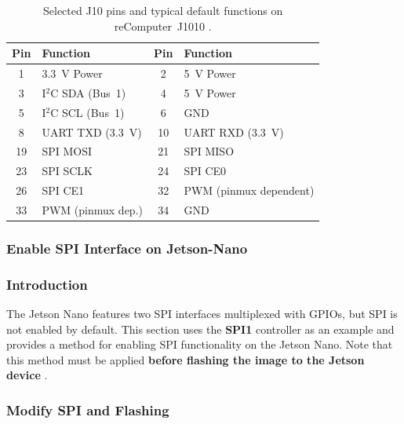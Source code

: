 \newpage
\begin{table}[H]
	\centering
	\caption{Selected J10 pins and typical default functions on reComputer~J1010 \cite{reComputer_Jetson_GPIO,seeedJ101Manual}.}
	\label{tab:j10_selected}
	\begin{tabular}{|c|l|c|l|}
		\hline
		\textbf{Pin} & \textbf{Function} & \textbf{Pin} & \textbf{Function} \\ \hline
		1 & 3.3~V Power      & 2  & 5~V Power \\ \hline
		3 & I$^2$C SDA (Bus~1) & 4  & 5~V Power \\ \hline
		5 & I$^2$C SCL (Bus~1) & 6  & GND \\ \hline
		8 & \ac{UART} TXD (3.3~V)  & 10 & \ac{UART} RXD (3.3~V) \\ \hline
		19 & \ac{SPI} MOSI         & 21 & \ac{SPI} MISO \\ \hline
		23 & \ac{SPI} SCLK         & 24 & \ac{SPI} CE0 \\ \hline
		26 & \ac{SPI} CE1          & 32 & \ac{PWM} (pinmux dependent) \\ \hline
		33 & \ac{PWM} (pinmux dep.) & 34 & GND \\ \hline
	\end{tabular}
\end{table}
\bigskip


\newpage
\subsubsection{Enable \ac{SPI} Interface on Jetson-Nano}
\label{subsec:enable_spi}

\subsubsection{Introduction}
\label{subsubsec:spi_intro}

The Jetson Nano features two \ac{SPI} interfaces multiplexed with \ac{GPIO}s, but \ac{SPI} is not enabled by default. 
This section uses the \textbf{\ac{SPI}1} controller as an example and provides a method for enabling \ac{SPI} functionality on the Jetson Nano. 
Note that this method must be applied \textbf{before flashing the image to the Jetson device} \cite{seeedJ101Manual,reComputer_FlashGuide}.

\subsubsection{Modify \ac{SPI} and Flashing}
\label{subsubsec:spi_modify}

